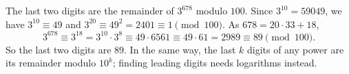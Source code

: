 The last two digits are the remainder of $3^{678}$ modulo $100$. Since $3^{10}=59049$, we have $3^{10}\equiv49$ and $3^{20}\equiv49^2=2401\equiv1\pmod{100}$. As $678=20\cdot33+18$,
\[
3^{678}\equiv3^{18}=3^{10}\cdot3^{8}\equiv49\cdot6561\equiv49\cdot61=2989\equiv89\pmod{100}.
\]
So the last two digits are $\boxed{89}$. In the same way, the last $k$ digits of any power are its remainder modulo $10^k$; finding leading digits needs logarithms instead.
